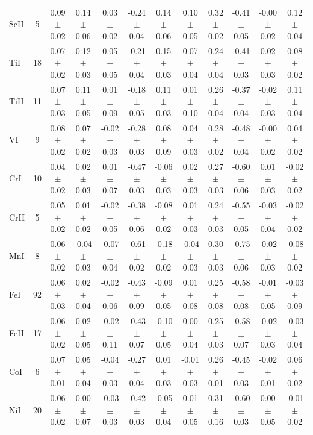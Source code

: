 \documentclass[oneside]{emulateapj}
\begin{document}
\begin{table}
\begin{tabular}{lccccccccccc}
ScII & 5 & 0.09 $\pm$ 0.02 & 0.14 $\pm$ 0.06 & 0.03 $\pm$ 0.02 & -0.24 $\pm$ 0.04 & 0.14 $\pm$ 0.06 & 0.10 $\pm$ 0.05 & 0.32 $\pm$ 0.02 & -0.41 $\pm$ 0.05 & -0.00 $\pm$ 0.02 & 0.12 $\pm$ 0.04 \\
TiI & 18 & 0.07 $\pm$ 0.02 & 0.12 $\pm$ 0.03 & 0.05 $\pm$ 0.05 & -0.21 $\pm$ 0.04 & 0.15 $\pm$ 0.03 & 0.07 $\pm$ 0.04 & 0.24 $\pm$ 0.04 & -0.41 $\pm$ 0.03 & 0.02 $\pm$ 0.03 & 0.08 $\pm$ 0.02 \\
TiII & 11 & 0.07 $\pm$ 0.03 & 0.11 $\pm$ 0.05 & 0.01 $\pm$ 0.09 & -0.18 $\pm$ 0.05 & 0.11 $\pm$ 0.03 & 0.01 $\pm$ 0.10 & 0.26 $\pm$ 0.04 & -0.37 $\pm$ 0.04 & -0.02 $\pm$ 0.03 & 0.11 $\pm$ 0.04 \\
VI & 9 & 0.08 $\pm$ 0.02 & 0.07 $\pm$ 0.02 & -0.02 $\pm$ 0.03 & -0.28 $\pm$ 0.03 & 0.08 $\pm$ 0.09 & 0.04 $\pm$ 0.03 & 0.28 $\pm$ 0.02 & -0.48 $\pm$ 0.04 & -0.00 $\pm$ 0.02 & 0.04 $\pm$ 0.02 \\
CrI & 10 & 0.04 $\pm$ 0.02 & 0.02 $\pm$ 0.03 & 0.01 $\pm$ 0.07 & -0.47 $\pm$ 0.03 & -0.06 $\pm$ 0.03 & 0.02 $\pm$ 0.03 & 0.27 $\pm$ 0.03 & -0.60 $\pm$ 0.06 & 0.01 $\pm$ 0.03 & -0.02 $\pm$ 0.02 \\
CrII & 5 & 0.05 $\pm$ 0.02 & 0.01 $\pm$ 0.02 & -0.02 $\pm$ 0.05 & -0.38 $\pm$ 0.06 & -0.08 $\pm$ 0.02 & 0.01 $\pm$ 0.03 & 0.24 $\pm$ 0.03 & -0.55 $\pm$ 0.05 & -0.03 $\pm$ 0.04 & -0.02 $\pm$ 0.02 \\
MnI & 8 & 0.06 $\pm$ 0.02 & -0.04 $\pm$ 0.03 & -0.07 $\pm$ 0.04 & -0.61 $\pm$ 0.02 & -0.18 $\pm$ 0.02 & -0.04 $\pm$ 0.03 & 0.30 $\pm$ 0.03 & -0.75 $\pm$ 0.06 & -0.02 $\pm$ 0.03 & -0.08 $\pm$ 0.02 \\
FeI & 92 & 0.06 $\pm$ 0.03 & 0.02 $\pm$ 0.04 & -0.02 $\pm$ 0.06 & -0.43 $\pm$ 0.09 & -0.09 $\pm$ 0.05 & 0.01 $\pm$ 0.08 & 0.25 $\pm$ 0.08 & -0.58 $\pm$ 0.08 & -0.01 $\pm$ 0.05 & -0.03 $\pm$ 0.09 \\
FeII & 17 & 0.06 $\pm$ 0.02 & 0.02 $\pm$ 0.05 & -0.02 $\pm$ 0.11 & -0.43 $\pm$ 0.07 & -0.10 $\pm$ 0.05 & 0.00 $\pm$ 0.04 & 0.25 $\pm$ 0.03 & -0.58 $\pm$ 0.07 & -0.02 $\pm$ 0.03 & -0.03 $\pm$ 0.04 \\
CoI & 6 & 0.07 $\pm$ 0.01 & 0.05 $\pm$ 0.04 & -0.04 $\pm$ 0.03 & -0.27 $\pm$ 0.04 & 0.01 $\pm$ 0.03 & -0.01 $\pm$ 0.03 & 0.26 $\pm$ 0.01 & -0.45 $\pm$ 0.03 & -0.02 $\pm$ 0.01 & 0.06 $\pm$ 0.02 \\
NiI & 20 & 0.06 $\pm$ 0.02 & 0.00 $\pm$ 0.07 & -0.03 $\pm$ 0.03 & -0.42 $\pm$ 0.03 & -0.05 $\pm$ 0.04 & 0.01 $\pm$ 0.05 & 0.31 $\pm$ 0.16 & -0.60 $\pm$ 0.03 & 0.00 $\pm$ 0.05 & -0.01 $\pm$ 0.02 \\

\end{tabular}
\end{table}
\end{document}
